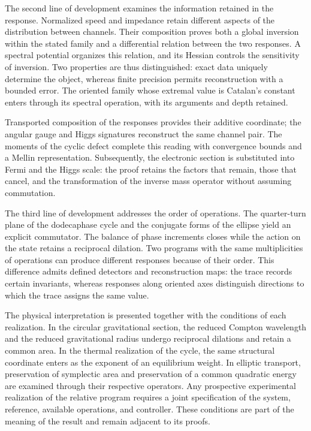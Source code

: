 The second line of development examines the information retained in the
response. Normalized speed and impedance retain different aspects of the
distribution between channels. Their composition proves both a global
inversion within the stated family and a differential relation between
the two responses. A spectral potential organizes this relation, and its
Hessian controls the sensitivity of inversion. Two properties are thus
distinguished: exact data uniquely determine the object, whereas finite
precision permits reconstruction with a bounded error. The oriented
family whose extremal value is Catalan's constant enters through its
spectral operation, with its arguments and depth retained.

Transported composition of the responses provides their additive
coordinate; the angular gauge and Higgs signatures reconstruct the same
channel pair. The moments of the cyclic defect complete this reading
with convergence bounds and a Mellin representation. Subsequently, the
electronic section is substituted into Fermi and the Higgs scale: the
proof retains the factors that remain, those that cancel, and the
transformation of the inverse mass operator without assuming commutation.

The third line of development addresses the order of operations. The
quarter-turn plane of the dodecaphase cycle and the conjugate forms of the
ellipse yield an explicit commutator. The balance of phase increments
closes while the action on the state retains a reciprocal dilation. Two
programs with the same multiplicities of operations can produce different
responses because of their order. This difference admits defined
detectors and reconstruction maps: the trace records certain invariants,
whereas responses along oriented axes distinguish directions to which the
trace assigns the same value.

The physical interpretation is presented together with the conditions of
each realization. In the circular gravitational section, the reduced
Compton wavelength and the reduced gravitational radius undergo
reciprocal dilations and retain a common area. In the thermal realization
of the cycle, the same structural coordinate enters as the exponent of an
equilibrium weight. In elliptic transport, preservation of symplectic area
and preservation of a common quadratic energy are examined through their
respective operators. Any prospective experimental realization of the relative
program requires a joint specification of the system, reference,
available operations, and controller. These conditions are part of the
meaning of the result and remain adjacent to its proofs.

